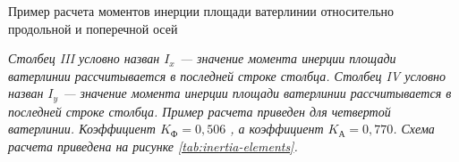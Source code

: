 \begin{table}[H]
    \centering
    \scriptsize
    \caption{Пример расчета моментов инерции площади ватерлинии относительно продольной и поперечной осей}
    \caption*{\textit{
        Столбец III условно назван $I_x$ --- значение момента инерции площади ватерлинии рассчитывается в последней строке столбца.
        Столбец IV условно назван $I_y$ --- значение  момента инерции площади ватерлинии рассчитывается в последней строке столбца.
        Пример расчета приведен для четвертой ватерлинии.
        Коэффициент $K_{\text{Ф}} = 0,506$ , а коэффициент $K_{\text{А}} = 0,770$.
        Схема расчета приведена на рисунке \ref{tab:inertia-elements}.
    }}
\end{table}


